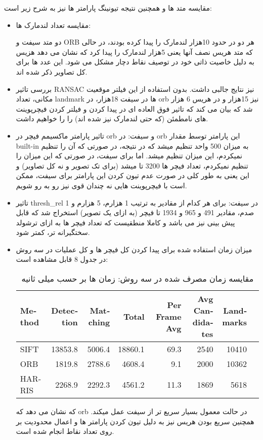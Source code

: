 \documentclass[a4paper,12pt]{article}
\begin{document}
مقایسه متد ها و همچنین نتیجه تیونینگ پارامتر ها نیز به شرح زیر است:
\begin{itemize}
	\item 
	 مقایسه تعداد لندمارک ها: 
	 
	 دو متد سیفت و ORB هر دو در حدود 10هزار لندمارک را پیدا کرده بودند، در حالی که متد هریس نصف آنها یعنی 5هزار لندمارک را پیدا کرد که نشان می دهد هزیس به دلیل خاصیت ذاتی خود در توصیف نقاط دچار مشکل می شود. این عدد ها برای کل تصاویر ذکر شده اند.
	\item 
	بررسی تاثیر RANSAC نیز نتایج جالبی داشت. بدون استفاده از این فیلتر موقعیت مکانی، تعداد landmark ها در سیفت 18هزار، در orb نیز 15هزار و در هریس 6 هزار شد که بیان می کند که تاثیر فوق العاده ای در پیدا کردن و فیلتر کردن فیچرپوینت های نامطمئن (که حتی لندمارک نیز شده اند) را را خواهیم داشت.
	
	\item 
	تاثیر پارامتر ماکسیمم فیچر در orb و سیفت:
	در orb این پارامتر توسط مقدار built-in به میزان 500 واحد تنظیم میشد که در نتیجه، در صورتی که آن را تنظیم نمیکردم، این میزان تنظیم میشد. اما برای سیفت، در صورتی که این میزان را تنظیم نمیکردم، تعداد فیچر ها 3200 تا میشد (برای تک تصویر و نه کل تصاویر) و این یعنی به طور کلی در صورت عدم تیون کردن این پارامتر برای سیفت، ممکن است با فیچرپوینت هایی نه چندان قوی نیز رو به رو شویم. 
	
	\item 
	تاثیر thresh\_rel در سیفت: 
	برای هر کدام از مقادیر به ترتیب 1 هزارم، 5 هزارم و 1 صدم، مقادیر 491 و 965 و 1934 تا فیچر (به ازای یک تصویر) استخراج شد که قابل پیش بینی نیز می باشد و کاملا منطقیست که تعداد فیچر ها به ازای ترشولد سختگیرانه تر، کمتر شود.
	
	\item 
	میزان زمان استفاده شده برای پیدا کردن کل فیچر ها و کل عملیات در سه روش در جدول 8 قابل مشاهده است:
	
	\begin{table}[h!]
		\centering
		\begin{latin}

		\begin{tabular}{|l|r|r|r|r|r|r|r|}
			\hline
			\textbf{Method} & \textbf{Detection} & \textbf{Matching} & \textbf{Total} & \textbf{Per Frame Avg} & \textbf{Avg Candidates} & \textbf{Landmarks} \\ \hline
			SIFT   & 13853.8 & 5006.4 & 18860.1 & 69.3 & 2540 & 10410 \\ \hline
			ORB    & 1819.8  & 2788.6 & 4608.4  & 9.1  & 2000 & 10362 \\ \hline
			HARRIS & 2268.9  & 2292.3 & 4561.2  & 11.3 & 1869 & 5618  \\ \hline
		\end{tabular}
		\end{latin}
		\caption{مقایسه زمان مصرف شده در سه روش: زمان ها بر حسب میلی ثانیه}
	\end{table}
	
	که نشان می دهد که orb در حالت معمول بسیار سریع تر از سیفت عمل میکند. همچنین سریع بودن هریس نیز به دلیل تیون کردن پارامتر ها و اعمال محدودیت بر روی تعداد نقاط انجام شده است.
	
\end{itemize}
\end{document}

